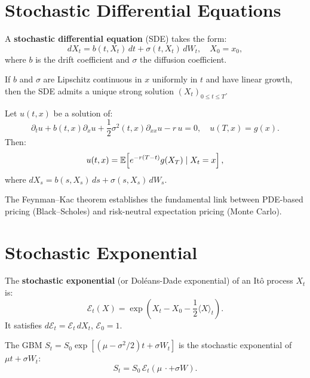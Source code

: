 \section{Stochastic Differential Equations}

\begin{definition}
A \textbf{stochastic differential equation} (SDE) takes the form:
\[
    dX_t = b(t, X_t)\,dt + \sigma(t, X_t)\,dW_t, \quad X_0 = x_0,
\]
where $b$ is the drift coefficient and $\sigma$ the diffusion coefficient.
\end{definition}

\begin{theorem}
If $b$ and $\sigma$ are Lipschitz continuous in $x$ uniformly in $t$ and
have linear growth, then the SDE admits a unique strong solution
$(X_t)_{0 \leq t \leq T}$.
\end{theorem}

\begin{theorem}
\label{thm:feynman_kac}
Let $u(t,x)$ be a solution of:
\[
    \partial_t u + b(t,x)\partial_x u
    + \frac{1}{2}\sigma^2(t,x)\partial_{xx}u - r\,u = 0,
    \quad u(T,x) = g(x).
\]
Then:
\[
    u(t,x) = \mathbb{E}\!\left[e^{-r(T-t)}g(X_T) \mid X_t = x\right],
\]
where $dX_s = b(s,X_s)\,ds + \sigma(s,X_s)\,dW_s$.
\end{theorem}

\begin{remark}
The Feynman--Kac theorem establishes the fundamental link between PDE-based
pricing (Black--Scholes) and risk-neutral expectation pricing (Monte Carlo).
\end{remark}

\section{Stochastic Exponential}

\begin{definition}
The \textbf{stochastic exponential} (or Dol\'eans-Dade exponential) of an
It\^o process $X_t$ is:
\[
    \mathcal{E}_t(X) = \exp\!\left(X_t - X_0 - \frac{1}{2}\langle X\rangle_t\right).
\]
It satisfies $d\mathcal{E}_t = \mathcal{E}_t\,dX_t$,
$\mathcal{E}_0 = 1$.
\end{definition}

\begin{proposition}
The GBM $S_t = S_0\exp\!\left[(\mu - \sigma^2/2)t + \sigma W_t\right]$
is the stochastic exponential of $\mu t + \sigma W_t$:
\[
    S_t = S_0\,\mathcal{E}_t(\mu\,\cdot + \sigma W).
\]
\end{proposition}


